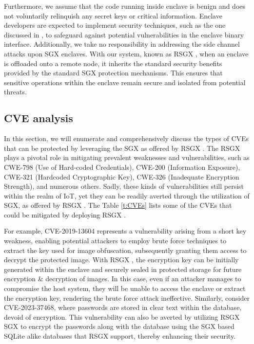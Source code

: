 \documentclass[article, doublespace,nopageskip]{VTthesis} %
\newcommand{\monitor}{RSGX \xspace}
\begin{document}
    Furthermore, we assume that the code running inside enclave is benign and does not voluntarily relinquish any secret keys or critical information. Enclave developers are expected to implement security techniques, such as the one discussed in \cite{Protecting, SGX-Defense}, to safeguard against potential vulnerabilities in the enclave binary interface. Additionally, we take no responsibility in addressing the side channel attacks upon SGX enclaves. With our system, known as \monitor, when an enclave is offloaded onto a remote node, it inherits the standard security benefits provided by the standard SGX protection mechanisms. This ensures that sensitive operations within the enclave remain secure and isolated from potential threats.

    \subsection{CVE analysis} \label{cve analysis}
    In this section, we will enumerate and comprehensively discuss the types of CVEs that can be protected by leveraging the SGX as offered by \monitor. The \monitor plays a pivotal role in mitigating prevalent weaknesses and vulnerabilities, such as CWE-798 (Use of Hard-coded Credentials), CWE-200 (Information Exposure), CWE-321 (Hardcoded Cryptographic Key), CWE-326 (Inadequate Encryption Strength), and numerous others. Sadly, these kinds of vulnerabilities still persist within the realm of IoT, yet they can be readily averted through the utilization of SGX, as offered by \monitor. The Table \ref{t:CVEs} lists some of the CVEs that could be mitigated by deploying \monitor.

    For example, CVE-2019-13604 represents a vulnerability arising from a short key weakness, enabling potential attackers to employ brute force techniques to extract the key used for image obfuscation, subsequently granting them access to decrypt the protected image. With \monitor, the encryption key can be initially generated within the enclave and securely sealed in protected storage for future encryption \& decryption of images. In this case, even if an attacker manages to compromise the host system, they will be unable to access the enclave or extract the encryption key, rendering the brute force attack ineffective. Similarly, consider CVE-2023-37468, where passwords are stored in clear text within the database, devoid of encryption. This vulnerability can also be averted by utilizing \monitor SGX to encrypt the passwords along with the database using the SGX based SQLite alike databases that \monitor support, thereby enhancing their security.
\end{document}
